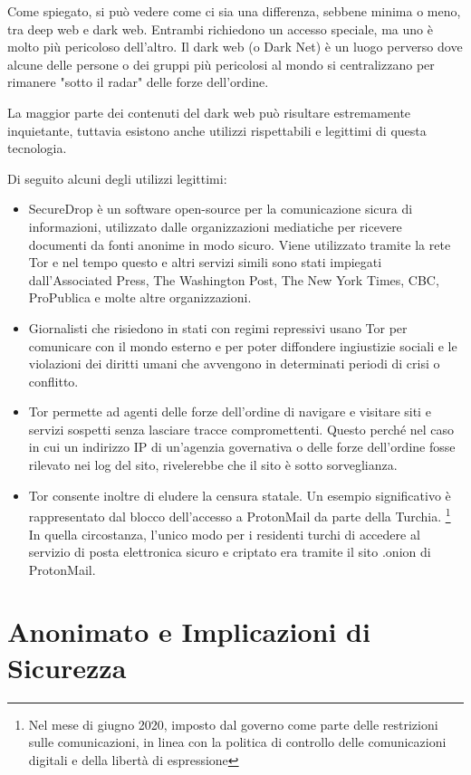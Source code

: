 Come spiegato, si può vedere come ci sia una differenza, sebbene minima o meno, tra deep web e dark web. Entrambi richiedono un accesso speciale, ma uno è molto più pericoloso dell'altro. Il dark web (o Dark Net) è un luogo perverso dove alcune delle persone o dei gruppi più pericolosi al mondo si centralizzano per rimanere "sotto il radar" delle forze dell'ordine.

La maggior parte dei contenuti del dark web può risultare estremamente inquietante, tuttavia esistono anche utilizzi rispettabili e legittimi di questa tecnologia.

Di seguito alcuni degli utilizzi legittimi:

\begin{itemize}
    \item SecureDrop è un software open-source per la comunicazione sicura di informazioni, utilizzato dalle organizzazioni mediatiche per ricevere documenti da fonti anonime in modo sicuro. Viene utilizzato tramite la rete Tor e nel tempo questo e altri servizi simili sono stati impiegati dall'Associated Press, The Washington Post, The New York Times, CBC, ProPublica e molte altre organizzazioni.
    \item Giornalisti che risiedono in stati con regimi repressivi usano Tor per comunicare con il mondo esterno e per poter diffondere ingiustizie sociali e le violazioni dei diritti umani che avvengono in determinati periodi di crisi o conflitto.
    \item Tor permette ad agenti delle forze dell'ordine di navigare e visitare siti e servizi sospetti senza lasciare tracce compromettenti. Questo perché nel caso in cui un indirizzo IP di un'agenzia governativa o delle forze dell'ordine fosse rilevato nei log del sito, rivelerebbe che il sito è sotto sorveglianza.
    \item Tor consente inoltre di eludere la censura statale. Un esempio significativo è rappresentato dal blocco dell'accesso a ProtonMail da parte della Turchia. \footnote{Nel mese di giugno 2020, imposto dal governo come parte delle restrizioni sulle comunicazioni, in linea con la politica di controllo delle comunicazioni digitali e della libertà di espressione} In quella circostanza, l'unico modo per i residenti turchi di accedere al servizio di posta elettronica sicuro e criptato era tramite il sito .onion di ProtonMail. \cite{darkweb4}
\end{itemize}

\section{Anonimato e Implicazioni di Sicurezza}\label{sec:cap_sec_darkweb4}

